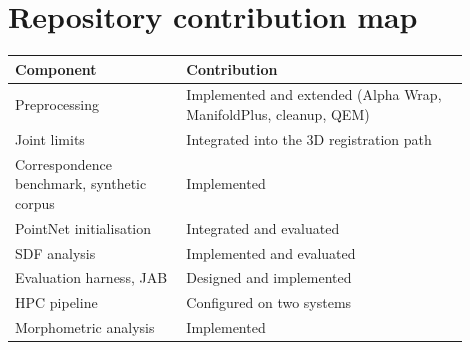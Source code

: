 \chapter{Repository contribution map}
\begin{center}
\small
\begin{tabular}{@{}p{0.34\linewidth}p{0.56\linewidth}@{}}
\toprule
\textbf{Component} & \textbf{Contribution} \\
\midrule
Preprocessing & Implemented and extended (Alpha Wrap, ManifoldPlus, cleanup, QEM) \\
Joint limits & Integrated into the 3D registration path \\
Correspondence benchmark, synthetic corpus & Implemented \\
PointNet initialisation & Integrated and evaluated \\
SDF analysis & Implemented and evaluated \\
Evaluation harness, JAB & Designed and implemented \\
HPC pipeline & Configured on two systems \\
Morphometric analysis & Implemented \\
\bottomrule
\end{tabular}
\end{center}
